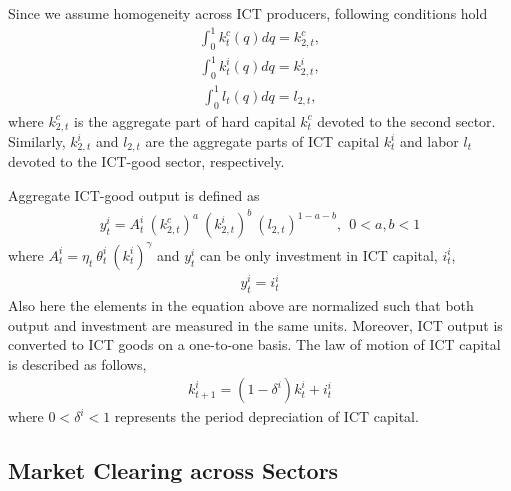 \documentclass[12pt]{article}
\begin{document}
Since we assume homogeneity across ICT producers, following conditions hold
\begin{eqnarray}\label{equation:aggregation_hard_ICTsec}
\int_0^1 k^c_{t}(q) dq = k^c_{2,t},
\end{eqnarray}
\begin{eqnarray}\label{equation:aggregation_ICT_ICTsec}
\int_0^1 k^i_{t}(q) dq = k^i_{2,t}, 
\end{eqnarray}
\begin{eqnarray}\label{equation:aggregation_labor_ICTsec}
\int_0^1 l_{t}(q) dq = l_{2,t},
\end{eqnarray}
where $k^c_{2,t}$ is the aggregate part of hard capital $k^c_t$ devoted to the second sector. Similarly, $k^i_{2,t}$ and $l_{2,t}$ are the aggregate parts of ICT capital $k^i_{t}$ and labor $l_{t}$ devoted to the ICT-good sector, respectively. 

Aggregate ICT-good output is defined as
\begin{eqnarray}\label{equation:production_ICT_aggregate}
	y^i_t = A^i_t \ ( k^c_{2,t} )^a \ ( k^i_{2,t} )^b \ ( l_{2,t} )^{1-a-b}, \ \ 0 < a,b < 1
\end{eqnarray}
where $A^i_t = \eta_t \ \theta^i_t \ (k^i_{t})^{\gamma}$ and $y^i_t$ can be only investment in ICT capital, $i^i_t$,
\begin{eqnarray}\label{equation:resourceICT}
y^i_t = i^i_t
\end{eqnarray}
Also here the elements in the equation above are normalized such that both output and investment are measured in the same units. Moreover, ICT output is converted to ICT goods on a one-to-one basis. The law of motion of ICT capital is described as follows,
\begin{eqnarray}\label{equation:LOM_ICT}
k^i_{t+1} = (1 - \delta^i) k^i_t + i^i_t
\end{eqnarray}
where $0 < \delta^i < 1$ represents the period depreciation of ICT capital.

\subsection{Market Clearing across Sectors}
\end{document}
